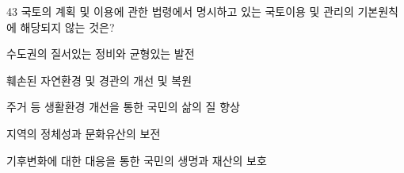 \begin{question}{43}
국토의 계획 및 이용에 관한 법령에서 명시하고 있는 국토이용 및 관리의 기본원칙에 해당되지 않는 것은?
\begin{choices}
  \item 수도권의 질서있는 정비와 균형있는 발전
  \item 훼손된 자연환경 및 경관의 개선 및 복원
  \item 주거 등 생활환경 개선을 통한 국민의 삶의 질 향상
  \item 지역의 정체성과 문화유산의 보전
  \item 기후변화에 대한 대응을 통한 국민의 생명과 재산의 보호
\end{choices}
\end{question}
